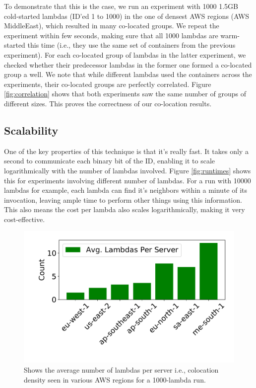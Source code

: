 To demonstrate that this is the case, we run an experiment with 1000 1.5GB cold-started lambdas (ID'ed 1 to 1000) in the
one of densest AWS regions (AWS MiddleEast), which resulted in many co-located groups. 
We repeat the experiment within few seconds, making sure that all 1000 lambdas are 
warm-started this time (i.e., they use the same set of containers from the previous experiment).
For each co-located group of lambdas in the latter experiment, we checked whether their 
predecessor lambdas in the former one formed a co-located group a well. We note that while 
different lambdas used the containers across the experiments, their co-located groups 
are perfectly correlated. Figure \ref{fig:correlation} shows that both experiments saw the same 
number of groups of different sizes. This proves the correctness of our co-location results.




\subsection{Scalability}
One of the key properties of this technique is that it's really fast.
It takes only a second to communicate each binary bit of the ID, enabling 
it to scale logarithmically with the number of lambdas involved. Figure 
\ref{fig:runtimes} shows this for experiments involving different number 
of lambdas. For a run with 10000 lambdas for example, each lambda can 
find it's neighbors within a minute of its invocation, leaving ample time 
to perform other things using this information. This also means the cost 
per lambda also scales logarithmically, making it very cost-effective.




\begin{figure}[!t]
  \includegraphics[width=.99\linewidth]{fig/density.pdf}
  \caption{Shows the average number of lambdas per server i.e., colocation 
  density seen in various AWS regions for a 1000-lambda run.
\label{fig:density}}
\end{figure}

